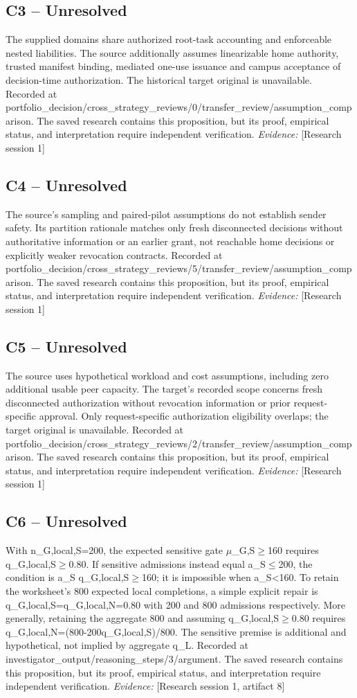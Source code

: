 \documentclass[11pt]{article}
\begin{document}
\subsection{C3 -- Unresolved}
The supplied domains share authorized root-task accounting and enforceable nested liabilities. The source additionally assumes linearizable home authority, trusted manifest binding, mediated one-use issuance and campus acceptance of decision-time authorization. The historical target original is unavailable.
Recorded at portfolio\_decision/cross\_strategy\_reviews/0/transfer\_review/assumption\_comparison. The saved research contains this proposition, but its proof, empirical status, and interpretation require independent verification.
\textit{Evidence: }[Research session 1]
\subsection{C4 -- Unresolved}
The source's sampling and paired-pilot assumptions do not establish sender safety. Its partition rationale matches only fresh disconnected decisions without authoritative information or an earlier grant, not reachable home decisions or explicitly weaker revocation contracts.
Recorded at portfolio\_decision/cross\_strategy\_reviews/5/transfer\_review/assumption\_comparison. The saved research contains this proposition, but its proof, empirical status, and interpretation require independent verification.
\textit{Evidence: }[Research session 1]
\subsection{C5 -- Unresolved}
The source uses hypothetical workload and cost assumptions, including zero additional usable peer capacity. The target's recorded scope concerns fresh disconnected authorization without revocation information or prior request-specific approval. Only request-specific authorization eligibility overlaps; the target original is unavailable.
Recorded at portfolio\_decision/cross\_strategy\_reviews/2/transfer\_review/assumption\_comparison. The saved research contains this proposition, but its proof, empirical status, and interpretation require independent verification.
\textit{Evidence: }[Research session 1]
\subsection{C6 -- Unresolved}
With n\_G,local,S=200, the expected sensitive gate $\mu$\_G,S$\geq$160 requires q\_G,local,S$\geq$0.80. If sensitive admissions instead equal a\_S$\leq$200, the condition is a\_S q\_G,local,S$\geq$160; it is impossible when a\_S\textless{}160. To retain the worksheet's 800 expected local completions, a simple explicit repair is q\_G,local,S=q\_G,local,N=0.80 with 200 and 800 admissions respectively. More generally, retaining the aggregate 800 and assuming q\_G,local,S$\geq$0.80 requires q\_G,local,N=(800-200q\_G,local,S)/800. The sensitive premise is additional and hypothetical, not implied by aggregate q\_L.
Recorded at investigator\_output/reasoning\_steps/3/argument. The saved research contains this proposition, but its proof, empirical status, and interpretation require independent verification.
\textit{Evidence: }[Research session 1, artifact 8]
\end{document}
